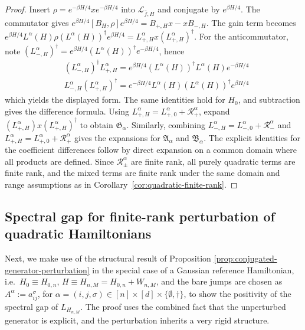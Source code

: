 \documentclass[11pt]{amsart}
\newcommand{\1}{\mathbbm{1}}
\theoremstyle{plain}
\theoremstyle{definition}
\theoremstyle{remark}
\numberwithin{equation}{section}
\begin{document}
\begin{proof}
Insert \(\rho=e^{-\beta H/4}xe^{-\beta H/4}\) into \(\mathcal L_{\widehat f,H}\) and conjugate by \(e^{\beta H/4}\). The commutator gives \(e^{\beta H/4}[B_H,\rho]e^{\beta H/4}=B_{+,H}x-xB_{-,H}\). The gain term becomes \(e^{\beta H/4}L^\alpha(H)\rho (L^\alpha(H))^\dagger e^{\beta H/4}=L_{+,H}^\alpha x (L_{+,H}^\alpha)^\dagger\). For the anticommutator, note \((L_{-,H}^\alpha)^\dagger=e^{\beta H/4}(L^\alpha(H))^\dagger e^{-\beta H/4}\), hence
\begin{align*}
&(L_{-,H}^\alpha)^\dagger L_{+,H}^\alpha=e^{\beta H/4}(L^\alpha(H))^\dagger L^\alpha(H)e^{-\beta H/4}\\
&  L_{-,H}^\alpha (L_{+,H}^\alpha)^\dagger=e^{-\beta H/4}L^\alpha(H)(L^\alpha(H))^\dagger e^{\beta H/4}
\end{align*}
which yields the displayed form. The same identities hold for \(H_0\), and subtraction gives the difference formula. Using \(L_{+,H}^\alpha=L_{+,0}^\alpha+\mathcal R_+^\alpha\), expand \((L_{+,H}^\alpha)x(L_{+,H}^\alpha)^\dagger\) to obtain \(\mathfrak G_\alpha\). Similarly, combining \(L_{-,H}^\alpha=L_{-,0}^\alpha+\mathcal R_-^\alpha\) and \(L_{+,H}^\alpha=L_{+,0}^\alpha+\mathcal R_+^\alpha\) gives the expansions for \(\mathfrak A_\alpha\) and \(\mathfrak B_\alpha\). The explicit identities for the coefficient differences follow by direct expansion on a common domain where all products are defined. Since \(\mathcal R_\pm^\alpha\) are finite rank, all purely quadratic terms are finite rank, and the mixed terms are finite rank under the same domain and range assumptions as in Corollary~\ref{cor:quadratic-finite-rank}.
\end{proof}



\subsection{Spectral gap for finite-rank perturbation of quadratic Hamiltonians}
\label{sec:GapForFiniteRankPerturb}

\noindent Next, we make use of the structural result of Proposition \ref{prop:conjugated-generator-perturbation} in the special case of a Gaussian reference Hamiltonian, i.e.~$H_0\equiv H_{0,n}$, $H\equiv H_{n,M}=H_{0,n}+ W_{n,M}$, and the bare jumps are chosen as $A^\alpha:=a_{ij}^\sigma$, for $\alpha=(i,j,\sigma)\in[n]\times [d]\times \{\emptyset,\dagger\}$, to show the positivity of the spectral gap of $L_{H_{n,M}}$. The proof uses the combined fact that the unperturbed generator is explicit, and the perturbation inherits a very rigid structure.
\end{document}
